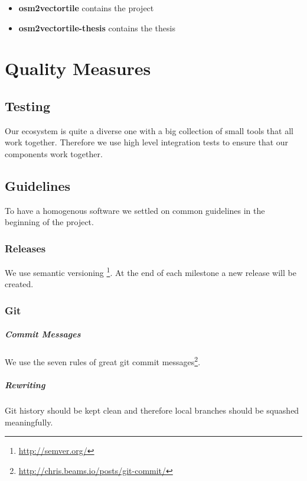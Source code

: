 \begin{itemize}
\item
  \textbf{osm2vectortile} contains the project
\item
  \textbf{osm2vectortile-thesis} contains the thesis
\end{itemize}

\newpage
\chapter{Quality Measures}\label{quality-measures}

\section{Testing}\label{testing}

Our ecosystem is quite a diverse one with a big collection of small
tools that all work together. Therefore we use high level integration
tests to ensure that our components work together.

\section{Guidelines}\label{guidelines}
To have a homogenous software we settled on common guidelines in 
the beginning of the project.

\subsection{Releases}
We use semantic versioning \footnote{\url{http://semver.org/}}. At the
end of each milestone a new release will be created.

\subsection{Git}\label{git}
\paragraph{Commit Messages}
We use the seven rules of great git commit
messages\footnote{\url{http://chris.beams.io/posts/git-commit/}}.

\paragraph{Rewriting}
Git history should be kept clean and therefore local branches should be
squashed meaningfully.

